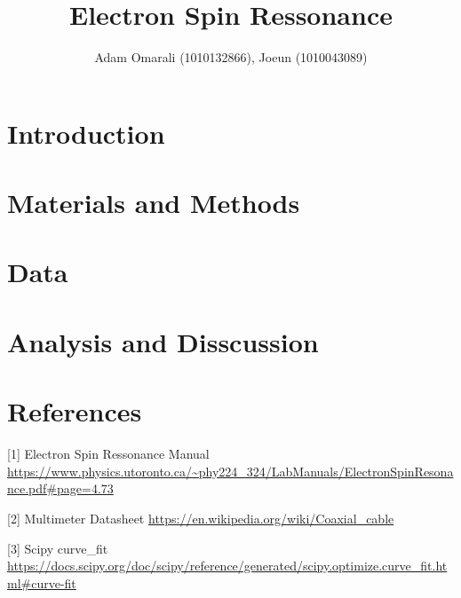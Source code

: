 \documentclass[12pt]{article}
\begin{document}
\vspace{-5cm}
\title{\bf{Electron Spin Ressonance}}
\author{Adam Omarali (1010132866), Joeun (1010043089)}
\maketitle

\section{Introduction}

\section{Materials and Methods}

\section{Data}

\section{Analysis and Disscussion}

\section{References}
[1] Electron Spin Ressonance Manual \url{https://www.physics.utoronto.ca/~phy224_324/LabManuals/ElectronSpinResonance.pdf#page=4.73}

[2] Multimeter Datasheet \url{https://en.wikipedia.org/wiki/Coaxial_cable}

[3] Scipy curve\_fit \url{https://docs.scipy.org/doc/scipy/reference/generated/scipy.optimize.curve_fit.html#curve-fit}
\end{document}

